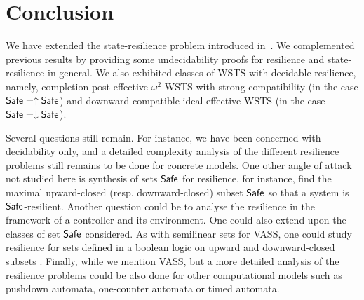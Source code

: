 



\section{Conclusion}


We have extended the state-resilience problem introduced in~\cite{DBLP:journals/corr/PrasadZ16,DBLP:journals/corr/abs-2108-00889,DBLP:conf/gg/Ozkan22}.
We complemented previous results by providing some undecidability proofs for resilience and state-resilience in general. We also exhibited classes of WSTS with decidable resilience, namely, 
completion-post-effective $\omega^2$-WSTS with strong compatibility (in the case 
 $\textsf{Safe} = \uparrow \textsf{Safe}$) and 
downward-compatible
ideal-effective WSTS
(in the case %
 $\textsf{Safe} = \downarrow \textsf{Safe}$).

Several questions still remain.
For instance, we have been concerned with decidability only, and a detailed complexity analysis of the different resilience problems still remains to be done for concrete models. 
One other angle of attack not studied here is synthesis of sets %
$\textsf{Safe}$ for resilience,
for instance, %
 find the maximal upward-closed (resp. downward-closed) subset 
$\textsf{Safe}$ so that a system is $\textsf{Safe}$-resilient. 
Another question could be to analyse the resilience in the framework of a controller and its environment. 
One could also extend upon the classes of set $\textsf{Safe}$ %
 considered. As with semilinear sets for VASS, one could study resilience for sets defined in a boolean logic on upward and downward-closed subsets \cite{DBLP:journals/fmsd/BertrandS13}. Finally, while we mention VASS, but a more detailed analysis of the resilience problems could be also done for other computational models such as pushdown automata, one-counter automata or timed automata.


%
%
%
%


